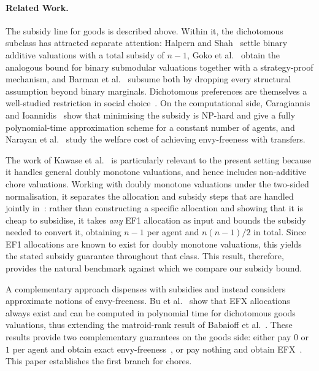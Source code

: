 \paragraph{Related Work.}
The subsidy line for goods is described above. Within it, the dichotomous
subclass has attracted separate attention: Halpern and Shah~\cite{HS19} settle
binary additive valuations with a total subsidy of $n-1$, Goko et
al.~\cite{goko2024fair} obtain the analogous bound for binary submodular valuations
together with a strategy-proof mechanism, and Barman et al.~\cite{BKNS22} subsume
both by dropping every structural assumption beyond binary marginals. Dichotomous
preferences are themselves a well-studied restriction in social
choice~\cite{BMS05,BEF21}. On the computational side, Caragiannis and
Ioannidis~\cite{CI21} show that minimising the subsidy is NP-hard and give a
fully polynomial-time approximation scheme for a constant number of agents, and
Narayan et al.~\cite{NSV21} study the welfare cost of achieving envy-freeness
with transfers.

The work of Kawase et al.~\cite{KMSTY24} is particularly relevant to the present setting because it handles general doubly monotone valuations, and hence includes non-additive chore valuations. Working with doubly monotone valuations under the two-sided normalisation,
it separates the allocation and subsidy steps that are handled jointly in~\cite{BDNSV20}: rather than constructing a specific allocation and showing that it is cheap to subsidise, it takes \emph{any} EF1
allocation as input and bounds the subsidy needed to convert it, obtaining $n-1$ per agent and $n(n-1)/2$ in total. Since EF1 allocations are known to exist for doubly monotone valuations, this yields the stated subsidy guarantee throughout that class. This result, therefore, provides the natural benchmark against which we compare our subsidy bound.

A complementary approach dispenses with subsidies and instead considers approximate notions of envy-freeness.  Bu et al.~\cite{BSY23} show that EFX allocations always
exist and can be computed in polynomial time for dichotomous goods valuations, thus
extending the matroid-rank result of Babaioff et al.~\cite{BEF21}. These results provide two complementary guarantees on the goods side: either pay $0$ or $1$ per agent and obtain exact envy-freeness~\cite{BKNS22}, or pay nothing and obtain EFX~\cite{BSY23}. This paper establishes the first branch for
chores.

